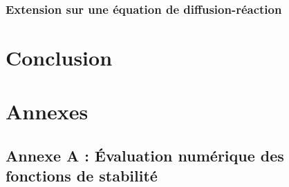 \documentclass[11pt]{report}
\theoremstyle{definition}
\theoremstyle{remark}
\begin{document}
        \subsection{Extension sur une équation de diffusion-réaction}      
\chapter{Conclusion}
    
        

\newpage

\printbibliography
{}

\newpage

\appendix
\chapter*{Annexes}
\section*{Annexe A : Évaluation numérique des fonctions de stabilité}



\end{document}
